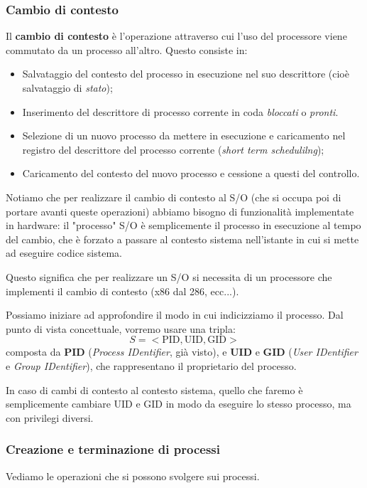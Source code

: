 \documentclass[a4paper,11pt]{article}
\begin{document}
\subsubsection{Cambio di contesto}
Il \textbf{cambio di contesto} è l'operazione attraverso cui l'uso del processore viene commutato da un processo all'altro.
Questo consiste in:
\begin{itemize}
	\item Salvataggio del contesto del processo in esecuzione nel suo descrittore (cioè salvataggio di \textit{stato});
	\item Inserimento del descrittore di processo corrente in coda \textit{bloccati} o \textit{pronti}.
	\item Selezione di un nuovo processo da mettere in esecuzione e caricamento nel registro del descrittore del processo corrente (\textit{short term schedulilng});
	\item Caricamento del contesto del nuovo processo e cessione a questi del controllo. 
\end{itemize}

Notiamo che per realizzare il cambio di contesto al S/O (che si occupa poi di portare avanti queste operazioni) abbiamo bisogno di funzionalità implementate in hardware: il "processo" S/O è semplicemente il processo in esecuzione al tempo del cambio, che è forzato a passare al contesto sistema nell'istante in cui si mette ad eseguire codice sistema.

Questo significa che per realizzare un S/O si necessita di un processore che implementi il cambio di contesto (x86 dal 286, ecc...). 

\par\smallskip

Possiamo iniziare ad approfondire il modo in cui indicizziamo il processo. Dal punto di vista concettuale, vorremo usare una tripla:
$$
S = < \text{PID}, \text{UID}, \text{GID} >
$$
composta da \textbf{PID} (\textit{Process IDentifier}, già visto), e \textbf{UID} e \textbf{GID} (\textit{User IDentifier} e \textit{Group IDentifier}), che rappresentano il proprietario del processo.

In caso di cambi di contesto al contesto sistema, quello che faremo è semplicemente cambiare UID e GID in modo da eseguire lo stesso processo, ma con privilegi diversi.

\subsubsection{Creazione e terminazione di processi}
Vediamo le operazioni che si possono svolgere sui processi.
\end{document}
